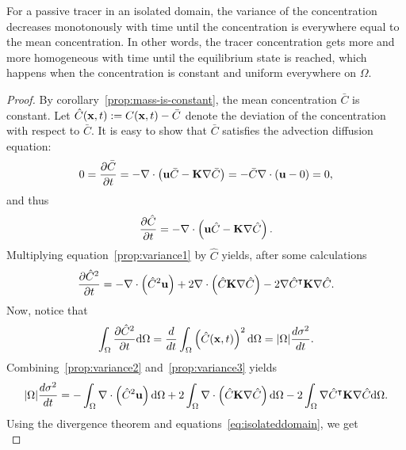 \begin{property}
	For a passive tracer in an isolated domain, the variance of the concentration decreases monotonously with time until the concentration is everywhere equal to the mean concentration. In other words, the tracer concentration gets more and more homogeneous with time until the equilibrium state is reached, which happens when the concentration is constant and uniform everywhere on $\Omega$.
\end{property}
\begin{proof}
	By corollary~\ref{prop:mass-is-constant}, the mean concentration $\bar C$ is constant. Let $\hat C(\mathbf x,t) := C(\mathbf x,t) - \bar C$ denote the deviation of the concentration with respect to $\bar C$. It is easy to show that $\bar C$ satisfies the advection diffusion equation:
	 \begin{equation}
	 	0 = \frac{\partial \bar C}{\partial t} = -\nabla \cdot \left(\mathbf u \bar C - \mathbf K \nabla \bar C\right) = - \bar C \nabla \cdot (\mathbf u - 0) = 0,
	 \end{equation}
	 and thus
	 \begin{equation} \label{prop:variance1}
	 	\frac{\partial \hat C}{\partial t} = -\nabla \cdot \left(\mathbf u \hat C - \mathbf K \nabla \hat C\right).
	 \end{equation}
	 Multiplying equation~\eqref{prop:variance1} by $\hat C$ yields, after some calculations
	 \begin{equation} \label{prop:variance2}
	 	\frac{\partial \hat C^2}{\partial t} = - \nabla \cdot \left(\hat C^2 \mathbf u \right) + 2\nabla \cdot \left(\hat C \mathbf K \nabla \hat C \right) - 2 \nabla \hat C^\intercal \mathbf K \nabla \hat C.
	 \end{equation}
	 Now, notice that
	 \begin{equation} \label{prop:variance3}
	 	\int_{\Omega} \frac{\partial \hat C^2}{\partial t} \mathrm d\Omega = \frac{d}{dt} \int_{\Omega} \left( \hat C(\mathbf x,t) \right)^2 \mathrm d\Omega = |\Omega|\frac{d\sigma^2}{dt}.
	 \end{equation}
	 Combining~\eqref{prop:variance2} and~\eqref{prop:variance3} yields
	 \begin{equation}
	 	|\Omega|\frac{d\sigma^2}{dt} = - \int_{\Omega} \nabla \cdot \left(\hat C^2 \mathbf u \right) \mathrm d\Omega + 2 \int_{\Omega} \nabla \cdot \left(\hat C \mathbf K \nabla \hat C \right) \mathrm d\Omega -2 \int_{\Omega} \nabla \hat C^\intercal \mathbf K \nabla \hat C \mathrm d\Omega.
	 \end{equation}
	 Using the divergence theorem and equations~\eqref{eq:isolateddomain}, we get
	 \begin{equation}

\end{equation}
\end{proof}
